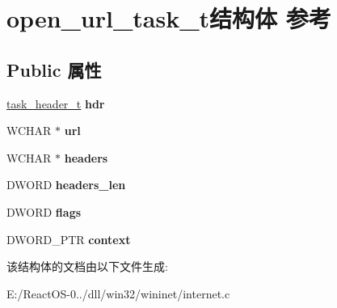 \hypertarget{structopen__url__task__t}{}\section{open\+\_\+url\+\_\+task\+\_\+t结构体 参考}
\label{structopen__url__task__t}
\subsection*{Public 属性}
\begin{DoxyCompactItemize}
\item 
\mbox{\label{structopen__url__task__t_abe64f0df4fe4bb163a7bba13dbd68893}} 
\hyperlink{structtask__header__t}{task\+\_\+header\+\_\+t} {\bfseries hdr}
\item 
\mbox{\label{structopen__url__task__t_a0cca27f2812805c18461583578aa78ce}} 
W\+C\+H\+AR $\ast$ {\bfseries url}
\item 
\mbox{\label{structopen__url__task__t_a22b92088ec15741b993df3f99c708e28}} 
W\+C\+H\+AR $\ast$ {\bfseries headers}
\item 
\mbox{\label{structopen__url__task__t_ab721c2c4b083bbbced4d3bb418dba7ea}} 
D\+W\+O\+RD {\bfseries headers\+\_\+len}
\item 
\mbox{\label{structopen__url__task__t_ad1ec66d29bff9f72ceee80156b140d1c}} 
D\+W\+O\+RD {\bfseries flags}
\item 
\mbox{\label{structopen__url__task__t_ae172fba93d21e8d5548bbd09ffb6fd4a}} 
D\+W\+O\+R\+D\+\_\+\+P\+TR {\bfseries context}
\end{DoxyCompactItemize}


该结构体的文档由以下文件生成\+:\begin{DoxyCompactItemize}
\item 
E\+:/\+React\+O\+S-\/0../dll/win32/wininet/internet.\+c\end{DoxyCompactItemize}
